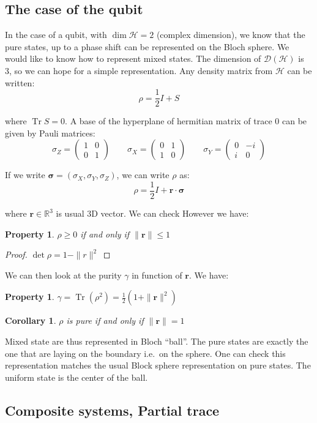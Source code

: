 \documentclass[10pt]{report}
\theoremstyle{plain}
\newtheorem{prop}[thm]{Property}
\newtheorem{cor}{Corollary}[thm]
\theoremstyle{definition}
\theoremstyle{remark}
\newcommand{\R}{\ensuremath{\mathbb{R}}}
\renewcommand{\geq}{\geqslant}
\renewcommand{\leq}{\leqslant}
\newcommand{\mat}[1]{\begin{pmatrix}#1\end{pmatrix}}
\newcommand{\bs}{\boldsymbol}
\DeclareMathOperator{\Tr}{Tr}
\begin{document}
\subsection{The case of the qubit}

In the case of a qubit, with $\dim \mathcal{H} = 2$ (complex dimension), we know
that the pure states, up to a phase shift can be represented on the Bloch sphere. We
would like to know how to represent mixed states. The dimension of
$\mathcal{D}(\mathcal{H})$ is 3, so we can hope for a simple representation. Any
density matrix from $\mathcal{H}$ can be written:
\[\rho = \frac12I + S\]

where $\Tr S = 0$. A base of the hyperplane of hermitian matrix of trace $0$ can
be given by Pauli matrices:
\[\sigma_Z = \mat{1&0\\0&1} \quad \quad \sigma_X = \mat{0&1\\1&0} \quad \quad
  \sigma_Y = \mat{0&-i\\i&0}\]

If we write $\bs\sigma = (\sigma_X,\sigma_Y,\sigma_Z)$, we can write
$\rho$ as:
\[\rho = \frac12 I + \bs r \cdot \bs \sigma\]

where $\bs r \in \R^3$ is usual 3D vector. We can check  However we have:

\begin{prop}
  $\rho \geq 0$ if and only if $\|\bs r\| \leq 1$
\end{prop}

\begin{proof}
  $\det \rho = 1 - \|r\|^2$
\end{proof}

We can then look at the purity $\gamma$ in function of $\bs r$. We have:

\begin{prop}
  $\gamma = \Tr(\rho^2) = \frac 12 (1 + \|\bs r\|^2)$
\end{prop}

\begin{cor}
  $\rho$ is pure if and only if $\|\bs r\| = 1$
\end{cor}

Mixed state are thus represented in Bloch ``ball''. The pure states are exactly
the one that are laying on the boundary i.e.\ on the sphere. One can check this
representation matches the usual Block sphere representation on pure states. The
uniform state is the center of the ball.

\subsection{Composite systems, Partial trace}
\end{document}
